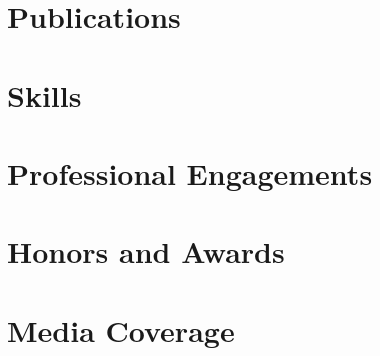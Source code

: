 	
	
		
	
		
	
		

	\section{Publications}
	
	

	\section{Skills}

	

	\section{Professional Engagements}

	
	
	\section{Honors and Awards}
	
	

	\section{Media Coverage}

	
	


